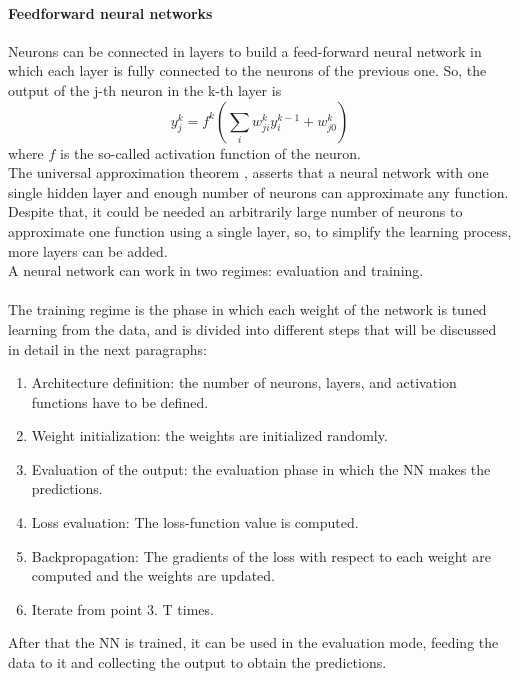 \paragraph*{Feedforward neural networks}
Neurons can be connected in layers to build a feed-forward neural network in which each layer is fully connected to the neurons of the previous one.
So, the output of the j-th neuron in the k-th layer is
\begin{equation}
    y^k_{j}=  f^k\left(\sum_i w^k_{ji} y^{k-1}_i + w_{j0}^k\right)
\end{equation}
where $f$ is the so-called activation function of the neuron.\\
The universal approximation theorem \cite{Hornik1989MultilayerApproximators}, asserts that a neural network with one single hidden layer and enough number of neurons can approximate any function.\\
Despite that, it could be needed an arbitrarily large number of neurons to approximate one function using a single layer, so, to simplify the learning process, more layers can be added.\\
A neural network can work in two regimes: evaluation and training.\\
\\
The training regime is the phase in which each weight of the network is tuned learning from the data, and is divided into different steps that will be discussed in detail in the next paragraphs:
\begin{enumerate}
    \item Architecture definition: the number of neurons, layers, and activation functions have to be defined.
    \item Weight initialization: the weights are initialized randomly.
    \item Evaluation of the output: the evaluation phase in which the NN makes the predictions.
    \item Loss evaluation: The loss-function value is computed.
    \item Backpropagation: The gradients of the loss with respect to each weight are computed and the weights are updated.
    \item Iterate from point 3. T times.
\end{enumerate}
After that the NN is trained, it can be used in the evaluation mode, feeding the data to it and collecting the output to obtain the predictions.
